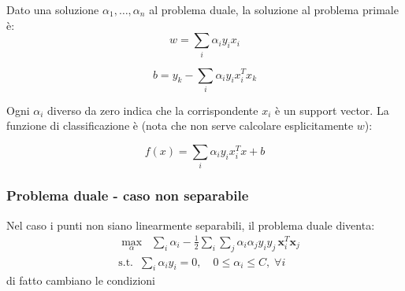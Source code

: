 Dato una soluzione $ \alpha_1, \ldots , \alpha_n $ al problema duale, la soluzione al problema primale è:
\[
	w = \sum_{i} \alpha_i y_i x_i
\]

\[
	b = y_k - \sum_{i} \alpha_i y_i x_i^{T} x_k
\]


Ogni $ \alpha_i $ diverso da zero indica che la corrispondente $ x_i $ è un support vector. La funzione di classificazione è (nota che non serve calcolare esplicitamente $ w $):

\[
	f(x) = \sum_{i} \alpha_i y_i x_i^{T} x + b
\]

\subsubsection{Problema duale - caso non separabile}
Nel caso i punti non siano linearmente separabili, il problema duale diventa:
\[
	\begin{aligned}
		 & \max_{\alpha} \;\; \sum_{i} \alpha_i - \frac{1}{2} \sum_{i} \sum_{j} \alpha_i \alpha_j y_i y_j\, \mathbf{x}_i^{T} \mathbf{x}_j \\
		 & \text{s.t.} \;\; \sum_{i} \alpha_i y_i = 0,\quad 0 \leq \alpha_i \leq C,\; \forall i
	\end{aligned}
\]
di fatto cambiano le condizioni

